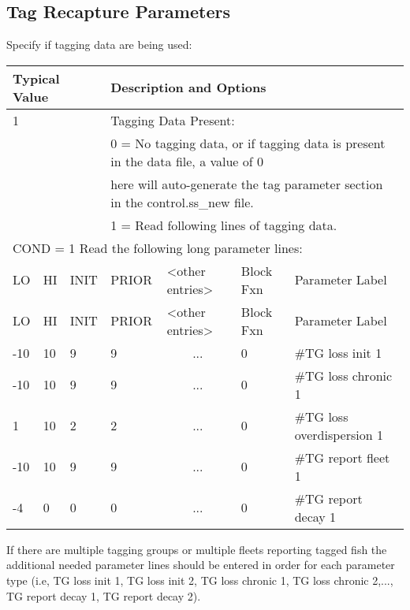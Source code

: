 \hypertarget{tagrecapture}{}
\subsection{Tag Recapture Parameters}
Specify if tagging data are being used:


\begin{longtable}{p{1cm} p{1cm} p{1cm} p{1.5cm} p{2.9cm} p{1.25cm} p{4.25cm}}
	\hline
	\multicolumn{3}{l}{Typical Value} & \multicolumn{4}{l}{Description and Options} \Tstrut\Bstrut\\
	\hline
	\multicolumn{3}{l}{1} & \multicolumn{4}{l}{Tagging Data Present:} \Tstrut\\
	\multicolumn{3}{l}{}  & \multicolumn{4}{l}{0 = No tagging data, or if tagging data is present in the data file, a value of 0} \\
	\multicolumn{3}{l}{}  & \multicolumn{4}{l}{here will auto-generate the tag parameter section in the control.ss\_new file.} \\
	\multicolumn{3}{l}{}  & \multicolumn{4}{l}{1 = Read following lines of tagging data.} \Bstrut\\


	\multicolumn{7}{l}{COND = 1 Read the following long parameter lines:} \Tstrut\\
	\hline
	LO \Tstrut & HI & INIT & PRIOR &  <other entries> & Block Fxn & Parameter Label \Bstrut\\
	\hline
	\endfirsthead

	\hline
	LO \Tstrut & HI & INIT & PRIOR & <other entries> & Block Fxn & Parameter Label \Bstrut\\
	\hline
	\endhead

	\hline
	\endfoot
	\endlastfoot

	-10 & 10 & 9 & 9 & \multicolumn{1}{c}{...} & 0 & \#TG loss init 1 \Tstrut\\
	-10 & 10 & 9 & 9 & \multicolumn{1}{c}{...} & 0 & \#TG loss chronic 1 \\
	  1 & 10 & 2 & 2 & \multicolumn{1}{c}{...} & 0 & \#TG loss overdispersion 1 \\
	-10 & 10 & 9 & 9 & \multicolumn{1}{c}{...} & 0 & \#TG report fleet 1 \\
	 -4 &  0 & 0 & 0 & \multicolumn{1}{c}{...} & 0 & \#TG report decay 1 \Bstrut\\
	 \hline
\end{longtable}

If there are multiple tagging groups or multiple fleets reporting tagged fish the additional needed parameter lines should be entered in order for each parameter type (i.e, TG loss init 1, TG loss init 2, TG loss chronic 1, TG loss chronic 2,..., TG report decay 1, TG report decay 2). 

